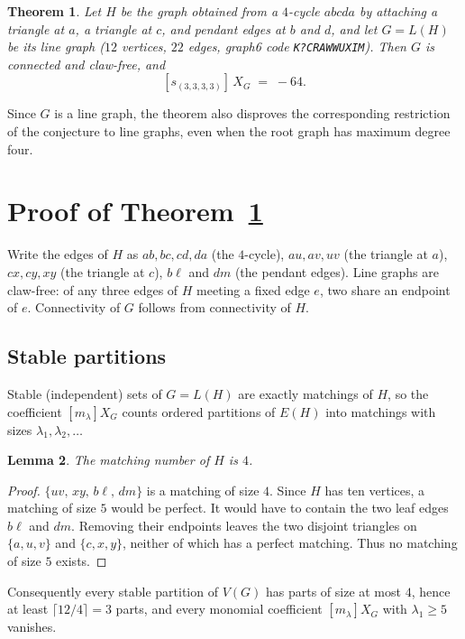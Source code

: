 \documentclass[11pt]{article}
\newtheorem{theorem}{Theorem}
\newtheorem{lemma}[theorem]{Lemma}
\theoremstyle{remark}
\newcommand{\csf}{X}
\begin{document}
\begin{theorem}\label{thm:main}
Let $H$ be the graph obtained from a $4$-cycle $abcda$ by attaching a
triangle at $a$, a triangle at $c$, and pendant edges at $b$ and $d$, and
let $G = L(H)$ be its line graph ($12$ vertices, $22$ edges, graph6 code
\texttt{K?\textasciigrave CRAWWUXIM}). Then $G$ is connected and claw-free,
and
\[
[s_{(3,3,3,3)}]\,\csf_G \;=\; -64 .
\]
\end{theorem}

Since $G$ is a line graph, the theorem also disproves the corresponding
restriction of the conjecture to line graphs, even when the root graph has
maximum degree four.

\section{Proof of Theorem~\ref{thm:main}}

Write the edges of $H$ as
$ab, bc, cd, da$ (the $4$-cycle), $au, av, uv$ (the triangle at $a$),
$cx, cy, xy$ (the triangle at $c$), $b\ell$ and $dm$ (the pendant edges).
Line graphs are claw-free: of any three edges of $H$ meeting a fixed edge
$e$, two share an endpoint of $e$. Connectivity of $G$ follows from
connectivity of $H$.

\subsection{Stable partitions}

Stable (independent) sets of $G = L(H)$ are exactly matchings of $H$, so
the coefficient $[m_\lambda] \csf_G$ counts ordered partitions of $E(H)$
into matchings with sizes $\lambda_1, \lambda_2, \dots$

\begin{lemma}
The matching number of $H$ is $4$.
\end{lemma}

\begin{proof}
$\{uv,\, xy,\, b\ell,\, dm\}$ is a matching of size $4$. Since $H$ has ten
vertices, a matching of size $5$ would be perfect. It would have to contain
the two leaf edges $b\ell$ and $dm$. Removing their endpoints leaves the two
disjoint triangles on $\{a,u,v\}$ and $\{c,x,y\}$, neither of which has a
perfect matching. Thus no matching of size $5$ exists.
\end{proof}

Consequently every stable partition of $V(G)$ has parts of size at most
$4$, hence at least $\lceil 12/4 \rceil = 3$ parts, and every monomial
coefficient $[m_\lambda]\csf_G$ with $\lambda_1 \ge 5$ vanishes.
\end{document}
